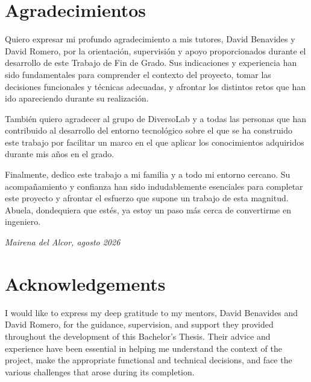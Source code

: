\chapter*{Agradecimientos}

Quiero expresar mi profundo agradecimiento a mis tutores, David Benavides y David Romero, por la orientación, supervisión y apoyo proporcionados durante el desarrollo de este Trabajo de Fin de Grado. Sus indicaciones y experiencia han sido fundamentales para comprender el contexto del proyecto, tomar las decisiones funcionales y técnicas adecuadas, y afrontar los distintos retos que han ido apareciendo durante su realización.

También quiero agradecer al grupo de DiversoLab y a todas las personas que han contribuido al desarrollo del entorno tecnológico sobre el que se ha construido este trabajo por facilitar un marco en el que aplicar los conocimientos adquiridos durante mis años en el grado.

Finalmente, dedico este trabajo a mi familia y a todo mi entorno cercano. Su acompañamiento y confianza han sido indudablemente esenciales para completar este proyecto y afrontar el esfuerzo que supone un trabajo de esta magnitud. Abuela, dondequiera que estés, ya estoy un paso más cerca de convertirme en ingeniero.

\begin{flushright}
\textit{Mairena del Alcor, agosto 2026}
\end{flushright}

\chapter*{Acknowledgements}

I would like to express my deep gratitude to my mentors, David Benavides and David Romero, for the guidance, supervision, and support they provided throughout the development of this Bachelor's Thesis. Their advice and experience have been essential in helping me understand the context of the project, make the appropriate functional and technical decisions, and face the various challenges that arose during its completion.

